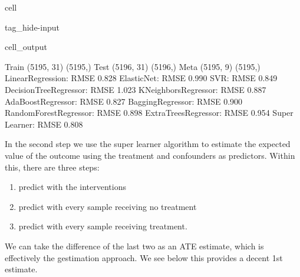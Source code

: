 \documentclass[letterpaper,10pt,english]{jupyterBook}
\begin{document}
\begin{sphinxuseclass}{cell}
\begin{sphinxuseclass}{tag_hide-input}\begin{sphinxVerbatimOutput}

\begin{sphinxuseclass}{cell_output}
\begin{sphinxVerbatim}[commandchars=\\\{\}]
Train (5195, 31) (5195,) Test (5196, 31) (5196,)
Meta  (5195, 9) (5195,)
LinearRegression: RMSE 0.828
ElasticNet: RMSE 0.990
SVR: RMSE 0.849
DecisionTreeRegressor: RMSE 1.023
KNeighborsRegressor: RMSE 0.887
AdaBoostRegressor: RMSE 0.827
BaggingRegressor: RMSE 0.900
RandomForestRegressor: RMSE 0.898
ExtraTreesRegressor: RMSE 0.954
Super Learner: RMSE 0.808
\end{sphinxVerbatim}

\end{sphinxuseclass}\end{sphinxVerbatimOutput}

\end{sphinxuseclass}
\end{sphinxuseclass}
\sphinxAtStartPar
In the second step we use the super learner algorithm to estimate the expected value of the outcome using the treatment and confounders as predictors. Within this, there are three steps:
\begin{enumerate}
%
\item {} 
\sphinxAtStartPar
predict with the interventions

\item {} 
\sphinxAtStartPar
predict with every sample receiving no treatment

\item {} 
\sphinxAtStartPar
predict with every sample receiving treatment.

\end{enumerate}

\sphinxAtStartPar
We can take the difference of the last two as an ATE estimate, which is effectively the g\sphinxhyphen{}estimation approach. We see below this provides a decent 1st estimate.
\end{document}

